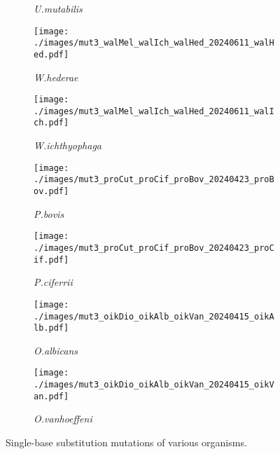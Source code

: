 \documentclass{article}
\begin{document}
\begin{figure}[h!]
\begin{subfigure}{0.32\textwidth}
      \caption{\textit{U.mutabilis}}
      \label{fig:fig1h}
    \end{subfigure}
    \hfill
    \begin{subfigure}{0.32\textwidth}
      \centering
      \texttt{[image: ./images/mut3\_walMel\_walIch\_walHed\_20240611\_walHed.pdf]}
      \caption{\textit{W.hederae}}
      \label{fig:fig1i}
    \end{subfigure}
    \vspace{0.1cm}
    \begin{subfigure}{0.32\textwidth}
      \centering
      \texttt{[image: ./images/mut3\_walMel\_walIch\_walHed\_20240611\_walIch.pdf]}
      \caption{\textit{W.ichthyophaga}}
      \label{fig:fig1j}
    \end{subfigure}
    \hfill
    \begin{subfigure}{0.32\textwidth}
      \centering
      \texttt{[image: ./images/mut3\_proCut\_proCif\_proBov\_20240423\_proBov.pdf]}
      \caption{\textit{P.bovis}}
      \label{fig:fig1k}
    \end{subfigure}
    \hfill
    \begin{subfigure}{0.32\textwidth}
      \centering
      \texttt{[image: ./images/mut3\_proCut\_proCif\_proBov\_20240423\_proCif.pdf]}
      \caption{\textit{P.ciferrii}}
      \label{fig:fig1l}
    \end{subfigure}
    \vspace{0.1cm}
    \begin{subfigure}{0.32\textwidth}
      \centering
      \texttt{[image: ./images/mut3\_oikDio\_oikAlb\_oikVan\_20240415\_oikAlb.pdf]}
      \caption{\textit{O.albicans}}
      \label{fig:fig1m}
    \end{subfigure}
    \hfill
    \begin{subfigure}{0.32\textwidth}
      \centering
      \texttt{[image: ./images/mut3\_oikDio\_oikAlb\_oikVan\_20240415\_oikVan.pdf]}
      \caption{\textit{O.vanhoeffeni}}
      \label{fig:fig1n}
    \end{subfigure}
    \caption{Single-base substitution mutations of various organisms.}
    \label{fig:fig1}
\end{figure}


\end{document}
